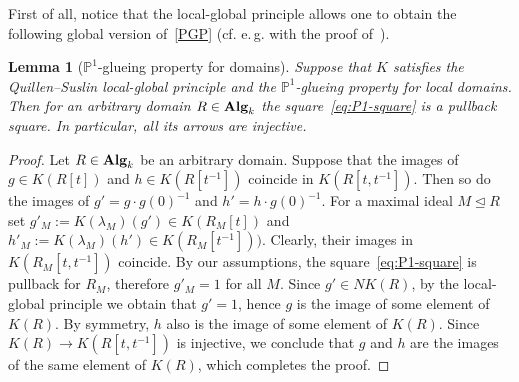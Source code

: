 \documentclass[oneside, 11pt]{amsart} \pdfoutput=1
\numberwithin{equation}{section}
\newtheorem{lemma}{Lemma} \numberwithin{lemma}{section}
\theoremstyle{definition}
\newcommand{\catname}[1]{{\normalfont\textbf{#1}}} %
\begin{document}
First of all, notice that the local-global principle allows one to obtain the following global version of~\ref{PGP} (cf. e.\,g. with the proof of~\cite[Theorem~1]{LS20}). 
\begin{lemma}[$\mathbb{P}^1$-glueing property for domains] \label{ght}
Suppose that $K$ satisfies the Quillen--Suslin local-global principle and the $\mathbb{P}^1$-glueing property for local domains. Then for an arbitrary domain $R \in \catname{Alg}_k$ the square~\eqref{eq:P1-square} is a pullback square. In particular, all its arrows are injective. \end{lemma}
\begin{proof}
Let $R \in \catname{Alg}_k$ be an arbitrary domain. Suppose that the images of $g \in K(R[t])$ and $h \in K(R[t^{-1}])$ coincide in $K(R[t, t^{-1}])$. Then so do the images of $g' = g \cdot g(0)^{-1}$ and $h' = h \cdot g(0)^{-1}$. For a maximal ideal $M\trianglelefteq R$ set $g'_M := K(\lambda_M)(g') \in K(R_M[t])$ and $h'_M := K(\lambda_M)(h') \in K(R_M[t^{-1}]))$. Clearly, their images in $K(R_M[t, t^{-1}])$ coincide. By our assumptions, the square~\eqref{eq:P1-square} is pullback for $R_M$, therefore $g'_M = 1$ for all $M$. Since $g' \in NK(R)$, by the local-global principle we obtain that $g' = 1$, hence $g$ is the image of some element of $K(R)$. By symmetry, $h$ also is the image of some element of $K(R)$. Since $K(R)\to K(R[t, t^{-1}])$ is injective, we conclude that $g$ and $h$ are the images of the same element of $K(R)$, which completes the proof.  \end{proof}
\end{document}
